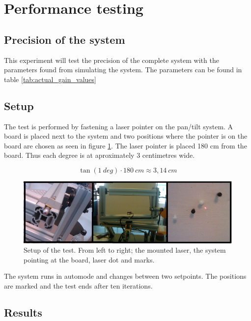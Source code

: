 \section{Performance testing}

\subsection{Precision of the system}\label{subsec:precisionofsystem}
This experiment will test the precision of the complete system with the
parameters found from simulating the system. The parameters can be found in
table \ref{tab:actual_gain_values}

\subsection*{Setup}

The test is performed by fastening a laser pointer on the pan/tilt system. A
board is placed next to the system and two positions where the pointer is on the
board are chosen as seen in figure \ref{fig:systemtestsetup}. The laser pointer is placed 180 cm
from the board. Thus each degree is at aproximately 3 centimetres wide.

\[ \tan(1 \ deg) \cdot 180 \ cm \approx 3,14 \ cm \]


\begin{figure}[htb] \centering \includegraphics[width=\textwidth,trim=0 0 0
0]{graphics/overallsystemtest.png} %
	\caption{Setup of the test. From left to right; the mounted laser, the system pointing at the board, laser dot and marks.}
	\label{fig:systemtestsetup}			%
\end{figure}

The system runs in automode and changes between two setpoints. The positions
are marked and the test ends after ten iterations. 

\subsection*{Results}


